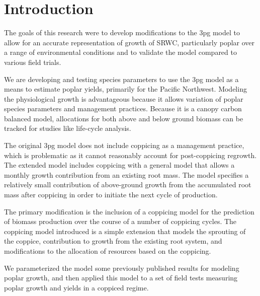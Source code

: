\documentclass[10pt]{article}
\begin{document}
\section*{Introduction}

The goals of this research were to develop modifications to the
\ac{3pg} model to allow for an accurate representation of growth of
\ac{SRWC}, particularly poplar over a range of environmental
conditions and to validate the model compared to various field trials.

We are developing and testing species parameters to use the \acf{3pg}
model as a means to estimate poplar yields, primarily for the Pacific
Northwest.  Modeling the physiological growth is advantageous because
it allows variation of poplar species parameters and management
practices.  Because it is a canopy carbon balanced model, allocations
for both above and below ground biomass can be tracked for studies
like life-cycle analysis.

The original \ac{3pg} model does not include coppicing as a management
practice, which is problematic as it cannot reasonably account for
post-coppicing regrowth.  The extended model includes coppicing with a
general model that allows a monthly growth contribution from an
existing root mass.  The model specifies a relatively small
contribution of above-ground growth from the accumulated root mass
after coppicing in order to initiate the next cycle of production.

The primary modification is the inclusion of a coppicing model for the
prediction of biomass production over the course of a number of
coppicing cycles.  The coppicing model introduced is a simple extension
that models the sprouting of the coppice, contribution to growth from
the existing root system, and modifications to the allocation of
resources based on the coppicing.

We parameterized the model some previously published results for
modeling poplar growth, and then applied this model to a set of field
tests measuring poplar growth and yields in a coppiced regime.

\newcommand{\pop}{\textit{Populus} }
\end{document}
